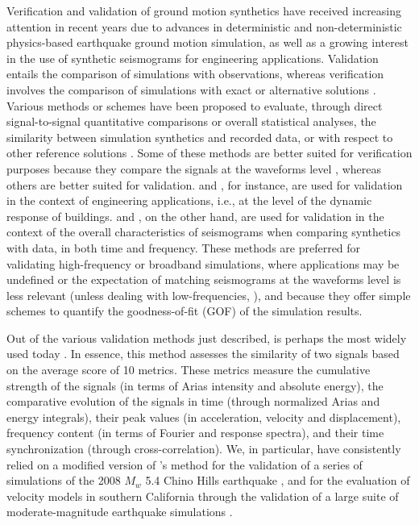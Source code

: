 
\introduction

Verification and validation of ground motion synthetics have received increasing attention in recent years due to advances in deterministic and non-deterministic physics-based earthquake ground motion simulation, as well as a growing interest in the use of synthetic seismograms for engineering applications. Validation entails the comparison of simulations with observations, whereas verification involves the comparison of simulations with exact or alternative solutions \citep[see][and references therein]{Bielak_2010_GJI, Taborda_2013_BSSA}. Various methods or schemes have been proposed to evaluate, through direct signal-to-signal quantitative comparisons or overall statistical analyses, the similarity between simulation synthetics and recorded data, or with respect to other reference solutions \citep{Anderson_2004_Proc, Kristekova_2006_BSSA, Kristekova_2009_GJI, Olsen_2010_SRL, Burks_BSSA_2014, Rezaeian_2015_BSSA}. Some of these methods are better suited for verification purposes because they compare the signals at the waveforms level \citep{Kristekova_2006_BSSA, Kristekova_2009_GJI}, whereas others are better suited for validation. \citet{Burks_BSSA_2014} and \citet{Rezaeian_2015_BSSA}, for instance, are used for validation in the context of engineering applications, i.e., at the level of the dynamic response of buildings. \citet{Anderson_2004_Proc} and \citet{Olsen_2010_SRL}, on the other hand, are used for validation in the context of the overall characteristics of seismograms when comparing synthetics with data, in both time and frequency. These methods are preferred for validating high-frequency or broadband simulations, where applications may be undefined or the expectation of matching seismograms at the waveforms level is less relevant (unless dealing with low-frequencies, ), and because they offer simple schemes to quantify the goodness-of-fit (GOF) of the simulation results.

Out of the various validation methods just described, \citet{Anderson_2004_Proc} is perhaps the most widely used today \citep[e.g.,][]{Chaljub_2010_BSSA, Bielak_2010_GJI, Guidotti_2011_SRL, Maufroy_2015_BSSA}. In essence, this method assesses the similarity of two signals based on the average score of 10 metrics. These metrics measure the cumulative strength of the signals (in terms of Arias intensity and absolute energy), the comparative evolution of the signals in time (through normalized Arias and energy integrals), their peak values (in acceleration, velocity and displacement), frequency content (in terms of Fourier and response spectra), and their time synchronization (through cross-correlation). We, in particular, have consistently relied on a modified version of \citeauthor{Anderson_2004_Proc}'s method for the validation of a series of simulations of the 2008 $M_w$ 5.4 Chino Hills earthquake \citep{Taborda_2013_BSSA, Taborda_2014_BSSA}, and for the evaluation of velocity models in southern California through the validation of a large suite of moderate-magnitude earthquake simulations \citep{Taborda_2016_GJI}.

